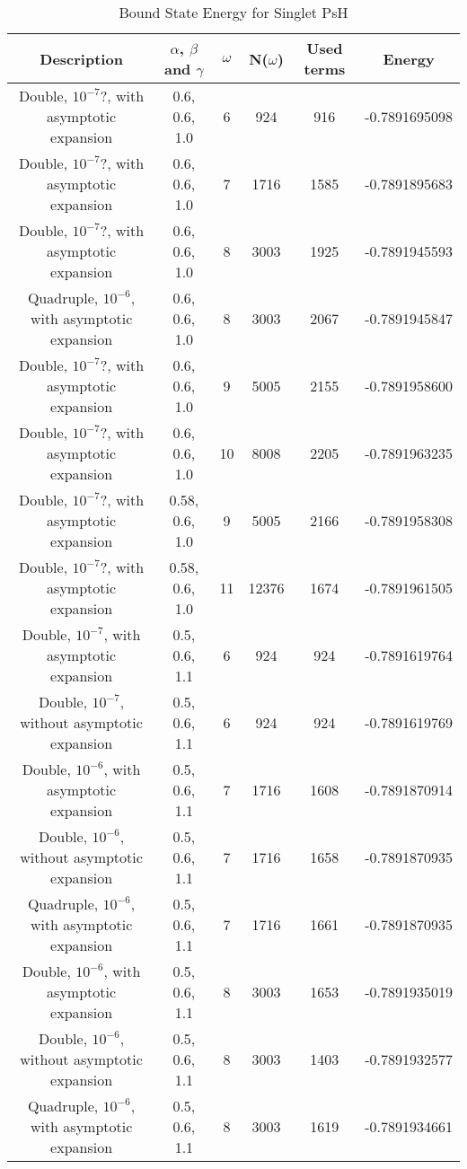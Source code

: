 \documentclass[Dissertation.tex]{subfiles}
\begin{document}
\begin{table}[H]
\begin{center}
\begin{tabular}{|c|c|c|c|c|c|}
\hline
Description & $\alpha$, $\beta$ and $\gamma$ & $\omega$ & N($\omega$) & Used terms & Energy\\
\hline
Double, $10^{-7}$?, with asymptotic expansion & 0.6, 0.6, 1.0 & 6 & 924 & 916 & -0.7891695098 \\
Double, $10^{-7}$?, with asymptotic expansion & 0.6, 0.6, 1.0 & 7 & 1716 & 1585 & -0.7891895683 \\
Double, $10^{-7}$?, with asymptotic expansion & 0.6, 0.6, 1.0 & 8 & 3003 & 1925 & -0.7891945593 \\
Quadruple, $10^{-6}$, with asymptotic expansion & 0.6, 0.6, 1.0 & 8 & 3003 & 2067 & -0.7891945847\\
Double, $10^{-7}$?, with asymptotic expansion & 0.6, 0.6, 1.0 & 9 & 5005 & 2155 & -0.7891958600 \\
\rowcolor{LightCyan}
Double, $10^{-7}$?, with asymptotic expansion & 0.6, 0.6, 1.0 & 10 & 8008 & 2205 & -0.7891963235 \\

Double, $10^{-7}$?, with asymptotic expansion & 0.58, 0.6, 1.0 & 9 & 5005 & 2166 & -0.7891958308\\
Double, $10^{-7}$?, with asymptotic expansion & 0.58, 0.6, 1.0 & 11 & 12376 & 1674 & -0.7891961505\\

Double, $10^{-7}$, with asymptotic expansion & 0.5, 0.6, 1.1 & 6 & 924 & 924 & -0.7891619764\\
Double, $10^{-7}$, without asymptotic expansion & 0.5, 0.6, 1.1 & 6 & 924 & 924 & -0.7891619769\\
\rowcolor{LightCyan}
Double, $10^{-6}$, with asymptotic expansion & 0.5, 0.6, 1.1 & 7 & 1716 & 1608 & -0.7891870914\\
Double, $10^{-6}$, without asymptotic expansion & 0.5, 0.6, 1.1 & 7 & 1716 & 1658 & -0.7891870935\\
Quadruple, $10^{-6}$, with asymptotic expansion & 0.5, 0.6, 1.1 & 7 & 1716 & 1661 & -0.7891870935\\
Double, $10^{-6}$, with asymptotic expansion & 0.5, 0.6, 1.1 & 8 & 3003 & 1653 & -0.7891935019\\
Double, $10^{-6}$, without asymptotic expansion & 0.5, 0.6, 1.1 & 8 & 3003 & 1403 & -0.7891932577\\
Quadruple, $10^{-6}$, with asymptotic expansion & 0.5, 0.6, 1.1 & 8 & 3003 & 1619 & -0.7891934661\\
\hline
\end{tabular}
\caption{Bound State Energy for Singlet PsH}
\label{tab:BoundSingletResults}
\end{center}
\end{table}
\end{document}

